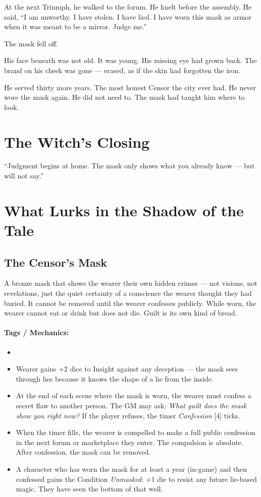 At the next Triumph, he walked to the forum. He knelt before the assembly. He said, ``I am unworthy. I have stolen. I have lied. I have worn this mask as armor when it was meant to be a mirror. Judge me.''

The mask fell off.

His face beneath was not old. It was young. His missing eye had grown back. The brand on his cheek was gone --- erased, as if the skin had forgotten the iron.

He served thirty more years. The most honest Censor the city ever had. He never wore the mask again. He did not need to. The mask had taught him where to look.

\section*{The Witch's Closing}
``Judgment begins at home. The mask only shows what you already know --- but will not say.''

\section*{What Lurks in the Shadow of the Tale}

\subsection*{The Censor's Mask}

A bronze mask that shows the wearer their own hidden crimes --- not visions, not revelations, just the quiet certainty of a conscience the wearer thought they had buried. It cannot be removed until the wearer confesses publicly. While worn, the wearer cannot eat or drink but does not die. Guilt is its own kind of bread.

\paragraph{Tags / Mechanics:}
\begin{itemize}
\item [CURSE] [TRUTH] [PRESSURE]
\item Wearer gains +2 dice to Insight against any deception --- the mask sees through lies because it knows the shape of a lie from the inside.
\item At the end of each scene where the mask is worn, the wearer must confess a secret flaw to another person. The GM may ask: \textit{What guilt does the mask show you right now?} If the player refuses, the timer \textit{Confession} [4] ticks.
\item When the timer fills, the wearer is compelled to make a full public confession in the next forum or marketplace they enter. The compulsion is absolute. After confession, the mask can be removed.
\item A character who has worn the mask for at least a year (in-game) and then confessed gains the Condition \textit{Unmasked}: +1 die to resist any future lie-based magic. They have seen the bottom of that well.
\end{itemize}

